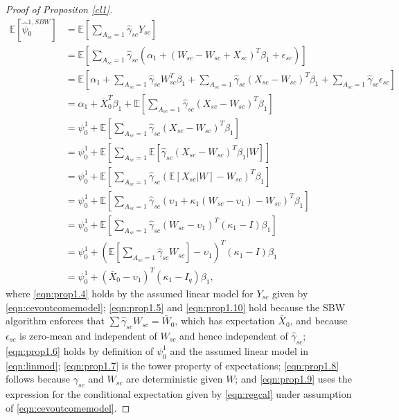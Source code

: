 \begin{proof}[Proof of Propositon \ref{cl1}]
\begin{align}
\nonumber	\mathbb{E}[\hat{\psi}_0^{1,SBW}] & = \mathbb{E}\left[ \sum_{A_{sc} = 1} \hat{\gamma}_{sc} Y_{sc}\right] \\
	& = \mathbb{E}\left[ \sum_{A_{sc}=1} \hat{\gamma}_{sc} \left(\alpha_1 + (W_{sc} - W_{sc} + X_{sc})^T \beta_1 + \epsilon_{sc}\right)\right] \label{eqn:prop1.4}\\
\nonumber	& = \mathbb{E}\left[ \alpha_1 + \sum_{A_{sc} = 1} \hat{\gamma}_{sc} W_{sc}^T \beta_1 + \sum_{A_{sc}=1} \hat{\gamma}_{sc} (X_{sc} - W_{sc})^T \beta_1 + \sum_{A_{sc}=1} \hat{\gamma}_{sc} \epsilon_{sc} \right] \\
	& = \alpha_1 + \bar{X}_0^T\beta_1 + \mathbb{E}\left[ \sum_{A_{sc} = 1} \hat{\gamma}_{sc}(X_{sc} - W_{sc})^T \beta_1\right] \label{eqn:prop1.5}\\
	& = \psi_0^1 + \mathbb{E} \left[ \sum_{A_{sc} = 1} \hat{\gamma}_{sc}(X_{sc} - W_{sc})^T \beta_1 \right] \label{eqn:prop1.6} \\
	& = \psi_0^1 + \mathbb{E} \left[ \sum_{A_{sc} = 1} \mathbb{E}\left[ \hat{\gamma}_{sc}(X_{sc} - W_{sc})^T \beta_1 | W \right] \right] \label{eqn:prop1.7} \\
	& = \psi_0^1 + \mathbb{E} \left[ \sum_{A_{sc} = 1}  \hat{\gamma}_{sc} (\mathbb{E}[X_{sc}|W] - W_{sc})^T \beta_1 \right] \label{eqn:prop1.8} \\
	& = \psi_0^1 + \mathbb{E} \left[ \sum_{A_{sc} = 1}  \hat{\gamma}_{sc} (\upsilon_1 + \kappa_1(W_{sc} - \upsilon_1) - W_{sc})^T \beta_1 \right] \label{eqn:prop1.9} \\
\nonumber	& = \psi_0^1 + \mathbb{E} \left[ \sum_{A_{sc} = 1}  \hat{\gamma}_{sc} (W_{sc} - \upsilon_1)^T(\kappa_1 - I)\beta_1 \right] \\
\nonumber	& = \psi_0^1 + \left(\mathbb{E}\left[\sum_{A_{sc} = 1} \hat{\gamma}_{sc} W_{sc}\right] - \upsilon_1\right)^T(\kappa_1 - I)\beta_1  \\
	& = \psi_0^1 + \left(\bar{X}_0 - \upsilon_1\right)^T(\kappa_1 - I_q)\beta_1,  \label{eqn:prop1.10}
\end{align}
%
where \eqref{eqn:prop1.4} holds by the assumed linear model for $Y_{sc}$ given by \eqref{eqn:cevoutcomemodel}; \eqref{eqn:prop1.5} and \eqref{eqn:prop1.10} hold because the SBW algorithm enforces that $\sum \hat{\gamma}_{sc} W_{sc} = \bar{W}_0$, which has expectation $\bar{X}_0$, and because $\epsilon_{sc}$ is zero-mean and independent of $W_{sc}$ and hence independent of $\hat{\gamma}_{sc}$; \eqref{eqn:prop1.6} holds by definition of $\psi_0^1$ and the assumed linear model in \eqref{eqn:linmod}; \eqref{eqn:prop1.7} is the tower property of expectations; \eqref{eqn:prop1.8} follows because $\gamma_{sc}$ and $W_{sc}$ are deterministic given $W$; and \eqref{eqn:prop1.9} uses the expression for the conditional expectation given by \eqref{eqn:regcal} under assumption of \eqref{eqn:cevoutcomemodel}.
\end{proof}


